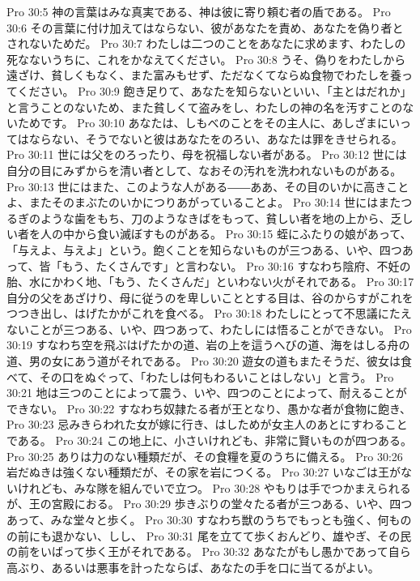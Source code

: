 Pro 30:5  神の言葉はみな真実である、神は彼に寄り頼む者の盾である。
Pro 30:6  その言葉に付け加えてはならない、彼があなたを責め、あなたを偽り者とされないためだ。
Pro 30:7  わたしは二つのことをあなたに求めます、わたしの死なないうちに、これをかなえてください。
Pro 30:8  うそ、偽りをわたしから遠ざけ、貧しくもなく、また富みもせず、ただなくてならぬ食物でわたしを養ってください。
Pro 30:9  飽き足りて、あなたを知らないといい、「主とはだれか」と言うことのないため、また貧しくて盗みをし、わたしの神の名を汚すことのないためです。
Pro 30:10  あなたは、しもべのことをその主人に、あしざまにいってはならない、そうでないと彼はあなたをのろい、あなたは罪をきせられる。
Pro 30:11  世には父をのろったり、母を祝福しない者がある。
Pro 30:12  世には自分の目にみずからを清い者として、なおその汚れを洗われないものがある。
Pro 30:13  世にはまた、このような人がある――ああ、その目のいかに高きことよ、またそのまぶたのいかにつりあがっていることよ。
Pro 30:14  世にはまたつるぎのような歯をもち、刀のようなきばをもって、貧しい者を地の上から、乏しい者を人の中から食い滅ぼすものがある。
Pro 30:15  蛭にふたりの娘があって、「与えよ、与えよ」という。飽くことを知らないものが三つある、いや、四つあって、皆「もう、たくさんです」と言わない。
Pro 30:16  すなわち陰府、不妊の胎、水にかわく地、「もう、たくさんだ」といわない火がそれである。
Pro 30:17  自分の父をあざけり、母に従うのを卑しいこととする目は、谷のからすがこれをつつき出し、はげたかがこれを食べる。
Pro 30:18  わたしにとって不思議にたえないことが三つある、いや、四つあって、わたしには悟ることができない。
Pro 30:19  すなわち空を飛ぶはげたかの道、岩の上を這うへびの道、海をはしる舟の道、男の女にあう道がそれである。
Pro 30:20  遊女の道もまたそうだ、彼女は食べて、その口をぬぐって、「わたしは何もわるいことはしない」と言う。
Pro 30:21  地は三つのことによって震う、いや、四つのことによって、耐えることができない。
Pro 30:22  すなわち奴隷たる者が王となり、愚かな者が食物に飽き、
Pro 30:23  忌みきらわれた女が嫁に行き、はしためが女主人のあとにすわることである。
Pro 30:24  この地上に、小さいけれども、非常に賢いものが四つある。
Pro 30:25  ありは力のない種類だが、その食糧を夏のうちに備える。
Pro 30:26  岩だぬきは強くない種類だが、その家を岩につくる。
Pro 30:27  いなごは王がないけれども、みな隊を組んでいで立つ。
Pro 30:28  やもりは手でつかまえられるが、王の宮殿におる。
Pro 30:29  歩きぶりの堂々たる者が三つある、いや、四つあって、みな堂々と歩く。
Pro 30:30  すなわち獣のうちでもっとも強く、何ものの前にも退かない、しし、
Pro 30:31  尾を立てて歩くおんどり、雄やぎ、その民の前をいばって歩く王がそれである。
Pro 30:32  あなたがもし愚かであって自ら高ぶり、あるいは悪事を計ったならば、あなたの手を口に当てるがよい。
